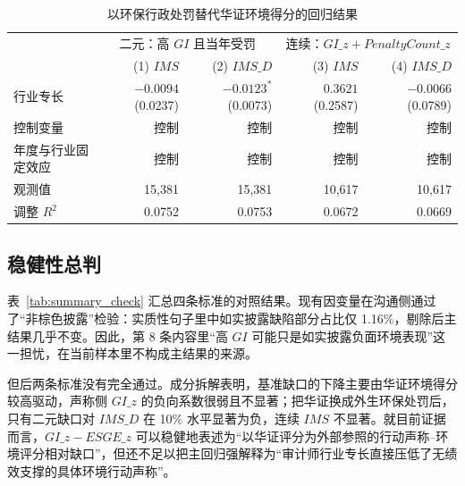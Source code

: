 \documentclass[12pt,a4paper]{article}
\begin{document}
\begin{table}[htbp]
\centering
\caption{以环保行政处罚替代华证环境得分的回归结果}
\label{tab:penalty_gap}
\renewcommand{\arraystretch}{1.25}
\begin{tabular}{lrrrr}
\toprule
 & \multicolumn{2}{c}{二元：高 $GI$ 且当年受罚} & \multicolumn{2}{c}{连续：$GI\_z + PenaltyCount\_z$} \\
\cmidrule(lr){2-3}\cmidrule(lr){4-5}
 & (1) $IMS$ & (2) $IMS\_D$ & (3) $IMS$ & (4) $IMS\_D$ \\
\midrule
行业专长 & \shortstack{$-0.0094$\\(0.0237)} & \shortstack{$-0.0123^{*}$\\(0.0073)} & \shortstack{$0.3621$\\(0.2587)} & \shortstack{$-0.0066$\\(0.0789)} \\
控制变量 & 控制 & 控制 & 控制 & 控制 \\
年度与行业固定效应 & 控制 & 控制 & 控制 & 控制 \\
观测值 & 15,381 & 15,381 & 10,617 & 10,617 \\
调整 $R^2$ & 0.0752 & 0.0753 & 0.0672 & 0.0669 \\
\bottomrule
\end{tabular}
\end{table}

\subsection{稳健性总判}

表~\ref{tab:summary_check} 汇总四条标准的对照结果。现有因变量在沟通侧通过了``非棕色披露''检验：实质性句子里中如实披露缺陷部分占比仅 1.16\%，剔除后主结果几乎不变。因此，第 8 条内容里``高 $GI$ 可能只是如实披露负面环境表现''这一担忧，在当前样本里不构成主结果的来源。

但后两条标准没有完全通过。成分拆解表明，基准缺口的下降主要由华证环境得分较高驱动，声称侧 $GI\_z$ 的负向系数很弱且不显著；把华证换成外生环保处罚后，只有二元缺口对 $IMS\_D$ 在 10\% 水平显著为负，连续 $IMS$ 不显著。就目前证据而言，$GI\_z-ESGE\_z$ 可以稳健地表述为``以华证评分为外部参照的行动声称--环境评分相对缺口''，但还不足以把主回归强解释为``审计师行业专长直接压低了无绩效支撑的具体环境行动声称''。

\begin{table}[htbp]
\centering
\caption{四项测度稳健性标准对照}
\label{tab:summary_check}
\end{table}
\end{document}
